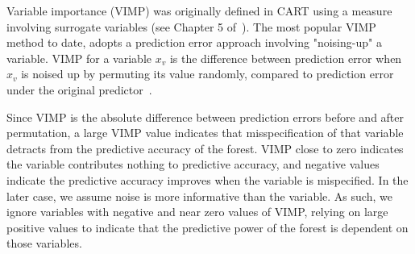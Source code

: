 \documentclass[nojss]{jss}\usepackage[]{graphicx}\usepackage[]{color}
\begin{document}
Variable importance (VIMP) was originally defined in CART using a measure involving surrogate variables (see Chapter 5 of~\cite{cart:1984}). The most popular VIMP method to date, adopts a prediction error approach involving "noising-up" a variable. VIMP for a variable $x_v$ is the difference between prediction error when $x_v$ is noised up by permuting its value randomly, compared to prediction error under the original predictor~\citep{Breiman:2001,liaw:2002,Ishwaran:2007,Ishwaran:2008}.

Since VIMP is the absolute difference between prediction errors before and after permutation, a large VIMP value indicates that misspecification of that variable detracts from the predictive accuracy of the forest. VIMP close to zero indicates the variable contributes nothing to predictive accuracy, and negative values indicate the predictive accuracy improves when the variable is mispecified. In the later case, we assume noise is more informative than the variable. As such, we ignore variables with negative and near zero values of VIMP, relying on large positive values to indicate that the predictive power of the forest is dependent on those variables. 
\end{document}
